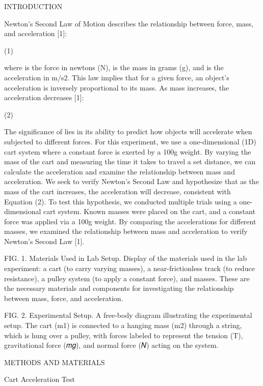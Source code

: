 ﻿INTRODUCTION


Newton’s  Second  Law  of  Motion  describes  the relationship between force, mass, and acceleration [1]: 


                             (1)


where  is the force in newtons (N),  is the mass in grams (g), and  is the acceleration in m/s2. This law implies that for a given force, an object’s acceleration is inversely proportional to its mass. As mass increases, the acceleration decreases [1]:   


                                                        (2)


The significance of  lies in its ability to predict how objects will accelerate when subjected to different forces. For this experiment, we use a one-dimensional (1D) cart system where a constant force is exerted by a 100g weight. By varying the mass of the cart and measuring the time it takes to travel a set distance, we can calculate the acceleration and examine the relationship between mass and acceleration. 
We seek to verify Newton’s Second Law and hypothesize that as the mass of the cart increases, the acceleration will decrease, consistent with Equation (2). To test this hypothesis, we conducted multiple trials using a one-dimensional cart system. Known masses were placed on the cart, and a constant force was applied via a 100g weight. By comparing the accelerations for different masses, we examined the relationship between mass and acceleration to verify Newton’s Second Law [1].


  

FIG. 1. Materials Used in Lab Setup.
Display of the materials used in the lab experiment: a cart (to carry varying masses), a near-frictionless track (to reduce resistance), a pulley system (to apply a constant force), and masses. These are the necessary materials and components for investigating the relationship between mass, force, and acceleration.
  

FIG. 2. Experimental Setup.
A free-body diagram illustrating the experimental setup. The cart (m1​) is connected to a hanging mass (m2) through a string, which is hung over a pulley, with forces labeled to represent the tension (T), gravitational force (𝑚𝑔), and normal force (𝑁) acting on the system.


METHODS AND MATERIALS


Cart Acceleration Test


